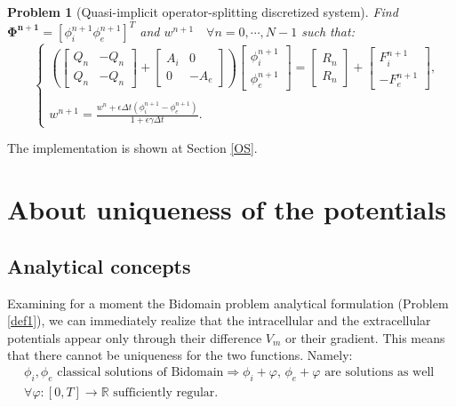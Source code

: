 \documentclass[a4paper,11pt]{article}
\newtheorem{problem}{Problem}
\begin{document}
\begin{problem} [Quasi-implicit operator-splitting discretized system]
Find $\bm{\Phi^{n+1}}=[\phi_i^{n+1} \phi_e^{n+1}]^T$ and $w^{n+1} \quad \forall n=0, \cdots, N-1$ such that:
\begin{equation*}
\quad
\begin{cases}
\left(
\begin{bmatrix} Q_n & -Q_n \\ Q_n & -Q_n \end{bmatrix} + 
\begin{bmatrix} A_i & 0 \\ 0 & -A_e\end{bmatrix}
\right)
\begin{bmatrix}
\phi_i^{n+1} \\ \phi_e^{n+1}
\end{bmatrix}
= \begin{bmatrix} R_n \\ R_n \end{bmatrix} + \begin{bmatrix} F_i^{n+1} \\  -F_e^{n+1}\end{bmatrix},\\ \\
w^{n+1} = \frac{\displaystyle w^n + \epsilon \Delta t (\phi_i^{n+1}-\phi_e^{n+1})}{\displaystyle 1+\epsilon \gamma \Delta t}.
\end{cases}
\end{equation*}
\end{problem}
\vspace{4mm}
\noindent The implementation is shown at Section \ref{OS}.
\newpage

\section{About uniqueness of the potentials}\label{unique}
\subsection{Analytical concepts}
\noindent Examining for a moment the Bidomain problem analytical formulation (Problem \ref{def1}), we can immediately realize that the intracellular and the extracellular potentials appear only through their difference $V_m$ or their gradient. This means that there cannot be uniqueness for the two functions. Namely: \vspace{2mm}
\begin{equation}\label{phi_uniqueness}
\begin{gathered}
\phi_i,\phi_e \text{ classical solutions of Bidomain} \Rightarrow \phi_i+\varphi,\,\phi_e+\varphi \text{ are solutions as well } \\
 \forall \varphi: [0,T] \rightarrow \mathbb{R} \text{  sufficiently regular}.
\end{gathered}
\end{equation}
\end{document}
